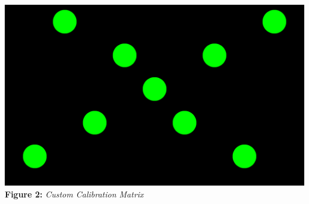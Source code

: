 \documentclass[twoside,twocolumn]{article}
\begin{document}
\begin{center}
	\includegraphics[scale=0.12]{calibrationMatrix} \\
	\vspace{0.1cm}
	\small{\textbf{Figure 2:} \textit{Custom Calibration Matrix}}
\end{center}
\end{document}
